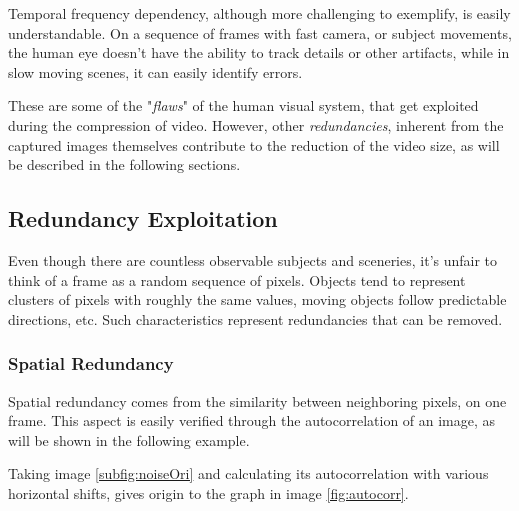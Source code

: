 Temporal frequency dependency, although more challenging to exemplify, is easily understandable. On a sequence of frames with fast camera, or subject movements, the human eye doesn't have the ability to track details or other artifacts, while in slow moving scenes, it can easily identify errors.

These are some of the "\emph{flaws}" of the human visual system, that get exploited during the compression of video. However, other \emph{redundancies}, inherent from the captured images themselves contribute to the reduction of the video size, as will be described in the following sections.

\subsection{Redundancy Exploitation}


Even though there are countless observable subjects and sceneries, it's unfair to think of a frame as a random sequence of pixels. Objects tend to represent clusters of pixels with roughly the same values, moving objects follow predictable directions, etc. Such characteristics represent redundancies that can be removed.

\subsubsection{Spatial Redundancy} \label{sssec:spatred}

Spatial redundancy comes from the similarity between neighboring pixels, on one frame. This aspect is easily verified through the autocorrelation of an image, as will be shown in the following example.

Taking image \ref{subfig:noiseOri} and calculating its autocorrelation with various horizontal shifts, gives origin to the graph in image \ref{fig:autocorr}.

